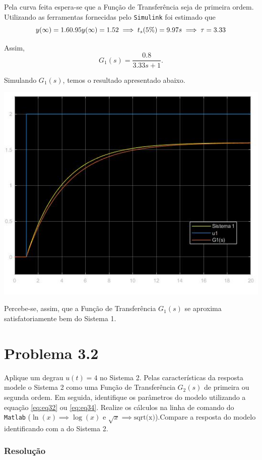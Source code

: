 \documentclass[
]{book}
\theoremstyle{definition}
\theoremstyle{definition}
\theoremstyle{definition}
\theoremstyle{remark}
\begin{document}
Pela curva feita espera-se que a Função de Transferência seja de primeira ordem. Utilizando as ferramentas fornecidas pelo \texttt{Simulink} foi estimado que
\[
y(\infty) = 1.6 \\ 
0.95y(\infty) = 1.52 \implies  t_s(5\%) = 9.97s \implies \tau = 3.33
\]

Assim,
\[
G_1(s) = \frac {0.8}{3.33s+1}.
\]

Simulando \(G_1(s)\), temos o resultado apresentado abaixo.

\includegraphics{Imagens/Lab3/Resolução/prob1B.jpg}

Percebe-se, assim, que a Função de Transferência \(G_1(s)\) se aproxima satisfatoriamente bem do Sistema 1.

\hypertarget{problema-3.2}{%
\section*{Problema 3.2}\label{problema-3.2}}

Aplique um degrau \(u(t) = 4\) no Sistema 2. Pelas características da resposta modele o Sistema 2 como uma Função de Transferência \(G_2(s)\) de primeira ou segunda ordem. Em seguida, identifique os parâmetros do modelo utilizando a equação \eqref{eq:eq32} ou \eqref{eq:eq34}. Realize os cálculos na linha de comando do \texttt{Matlab} (\(\ln{(x)} \implies \log{(x)}\) e \(\sqrt{x} \implies \text{sqrt(x)}\)).Compare a resposta do modelo identificando com a do Sistema 2.

\hypertarget{resoluuxe7uxe3o-1}{%
\subsubsection*{Resolução}\label{resoluuxe7uxe3o-1}}
\end{document}
